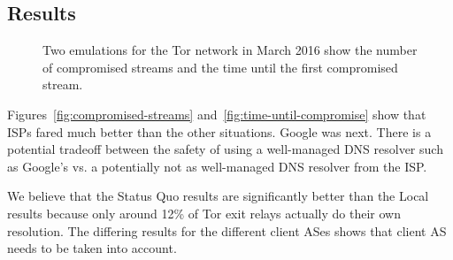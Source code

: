 \subsection{Results}

\begin{figure}[t]
\centering
{}
\caption{Two emulations for the Tor network in March 2016 show the
  number of compromised streams and the time until the first compromised
  stream.} 
\label{fig:compromise-stream-time}
\end{figure}

Figures~\ref{fig:compromised-streams}
and~\ref{fig:time-until-compromise} show that
ISPs fared much better than the other situations. Google was next. There is a potential 
tradeoff between the safety of using a well-managed DNS resolver such as Google's vs. 
a potentially not as well-managed DNS resolver from the ISP.  

We believe that the Status Quo results are significantly better than the 
Local results because only around 12\% of Tor exit relays actually do their own resolution.
The differing results for the different client ASes shows that client AS needs to be 
taken into account. 

